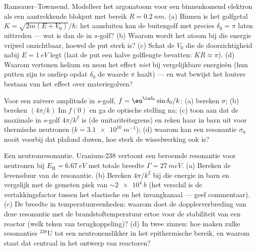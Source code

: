 \begin{exercise}[$\star\star$]\label{exo:b3:scattering-theory:8}
Ramsauer--Townsend. Modelleer het argonatoom voor een binnenkomend
elektron als een aantrekkende blokput met bereik $R =
\qty{0.2}{nm}$. (a)
Binnen is het golfgetal $K =
\sqrt{2m(E + V_0)}/\hbar$: het aansluiten kan
de buitengolf met precies $\delta_0 = \pi$ laten uittreden --- wat is dan
de  in $s$-golf? (b) Waarom wordt het atoom bij die
energie vrijwel onzichtbaar, hoewel de put sterk is? (c) Schat de $V_0$ die
de doorzichtigheid nabij $E = \qty{1}{eV}$ legt (laat de put een halve
golflengte bevatten: $KR \approx \pi$). (d) Waarom vertonen helium en neon
het effect \emph{niet} bij vergelijkbare energieën (hun putten zijn te
ondiep opdat $\delta_0$ de waarde $\pi$ haalt) --- en wat bewijst het
loutere bestaan van het effect over materiegolven?
\end{exercise}

\begin{exercise}[$\star\star$]\label{exo:b3:scattering-theory:9}
Voor een zuivere amplitude in $s$-golf, $f = \eu^{\iu\delta_0}\sin\delta_0/
k$: (a) bereken $\sigma$; (b) bereken $(4\pi/k)\operatorname{Im}
f(0)$ en ga de optische stelling na; (c) toon aan dat de maximale
 in $s$-golf $4\pi/k^2$ is (de unitariteitsgrens) en
reken haar in barn uit voor thermische neutronen ($k = \qty{3.1e10}{m^{-1}}$); (d) waarom kan een resonantie $\sigma_0$ nooit
voorbij dat plafond duwen, hoe sterk de wisselwerking ook is?
\end{exercise}

\begin{exercise}[$\star\star\star$]\label{exo:b3:scattering-theory:10}
Een neutronresonantie. Uranium-238 vertoont een beroemde resonantie voor
neutronen bij $E_{\text{R}} = \qty{6.67}{eV}$ met totale breedte $\Gamma = \qty{27}{meV}$. (a) Bereken de levensduur van de resonantie. (b) Bereken
$4\pi/k^2$ bij die energie in barn en vergelijk met de gemeten piek van
$\sim\qty{2e4}{b}$ (het verschil is de vertakkingsfactor tussen het
elastische en het invangkanaal --- geef commentaar). (c) De breedte in
temperatuureenheden: waarom doet de dopplerverbreding van deze resonantie
met de brandstoftemperatuur ertoe voor de stabiliteit van een reactor
(welk teken van terugkoppeling)? (d) In twee zinnen: hoe maken zulke
resonanties $^{238}$U tot een neutronenslikker in het epithermische
bereik, en waarom staat dat centraal in het ontwerp van reactoren?
\end{exercise}

